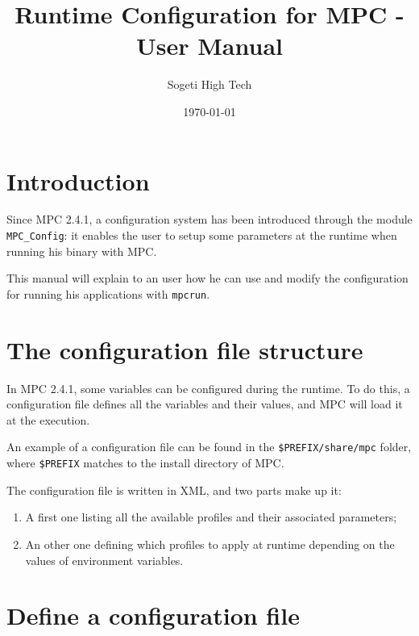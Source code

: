 \documentclass{article}
\author{Sogeti High Tech}
\title{Runtime Configuration for MPC - User Manual}
\date{\today}
\begin{document}
\hypersetup{pageanchor=false,citecolor=blue}
\maketitle

\newpage
{}
\tableofcontents
\newpage
{}
\hypersetup{pageanchor=true,citecolor=blue}

\section{Introduction}

Since MPC 2.4.1, a configuration system has been introduced through the module \texttt{MPC\_Config}: it enables the user to setup some parameters at the runtime when running his binary with MPC.
\newline

\noindent This manual will explain to an user how he can use and modify the configuration for running his applications with \texttt{mpcrun}.

\section {The configuration file structure}

In MPC 2.4.1, some variables can be configured during the runtime. To do this, a configuration file defines all the variables and their values, and MPC will load it at the execution.
\newline

\noindent An example of a configuration file can be found in the \texttt{\$PREFIX/share/mpc} folder, where \texttt{\$PREFIX} matches to the install directory of MPC.
\newline

\noindent The configuration file is written in XML, and two parts make up it:
\begin{enumerate}
\item A first one listing all the available profiles and their associated parameters;
\item An other one defining which profiles to apply at runtime depending on the values of environment variables.
\end{enumerate}

\section{Define a configuration file}
\end{document}
